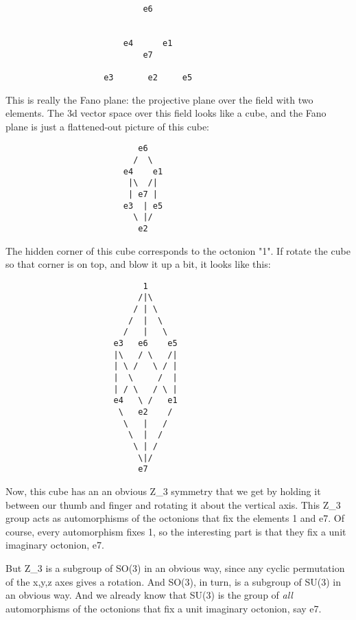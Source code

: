 \begin{verbatim}
                            e6

 
                        e4      e1
                            e7

                    e3       e2     e5
\end{verbatim}
    
This is really the Fano plane: the projective plane over the
field with two elements.  The 3d vector space over this field
looks like a cube, and the Fano plane is just a flattened-out
picture of this cube:
  
\begin{verbatim}
                           e6
                          /  \
                        e4    e1
                         |\  /| 
                         | e7 | 
                        e3  | e5
                          \ |/
                           e2     
\end{verbatim}
    
The hidden corner of this cube corresponds to the octonion "1". 
If rotate the cube so that corner is on top, and blow it up a bit,
it looks like this:

\begin{verbatim}
                            1
                           /|\
                          / | \
                         /  |  \         
                        /   |   \       
                      e3   e6    e5   
                      |\   / \   /| 
                      | \ /   \ / |
                      |  \     /  |
                      | / \   / \ |
                      e4   \ /   e1 
                       \   e2    / 
                        \   |   /                       
                         \  |  /
                          \ | /
                           \|/
                           e7
\end{verbatim}
    
Now, this cube has an an obvious Z_{3} symmetry that we get by
holding it between our thumb and finger and rotating it about 
the vertical axis.  This Z_{3} group acts as automorphisms
of the octonions that fix the elements 1 and e7.  Of course,
every automorphism fixes 1, so the interesting part is that
they fix a unit imaginary octonion, e7.  

But Z_{3} is a subgroup of SO(3) in an obvious way, since any 
cyclic permutation of the x,y,z axes gives a rotation.
And SO(3), in turn, is a subgroup of SU(3) in an obvious way. 
And we already know that SU(3) is the group of \emph{all} automorphisms 
of the octonions that fix a unit imaginary octonion, say e7.  

